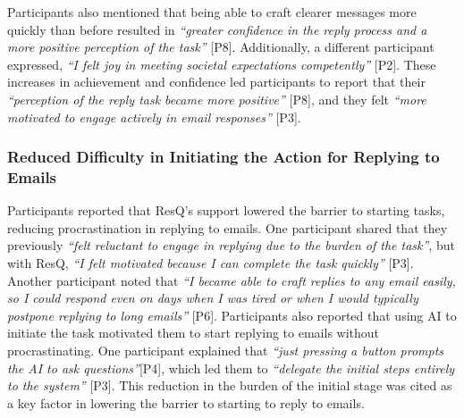 Participants also mentioned that being able to craft clearer messages more quickly than before resulted in \textit{``greater confidence in the reply process and a more positive perception of the task''} [P8]. 
Additionally, a different participant expressed, \textit{``I felt joy in meeting societal expectations competently''} [P2].
These increases in achievement and confidence led participants to report that their \textit{``perception of the reply task became more positive''} [P8], and they felt \textit{``more motivated to engage actively in email responses''} [P3]. 

\subsubsection{Reduced Difficulty in Initiating the Action for Replying to Emails}
\label{sec:result2_initiating_the_action}
Participants reported that ResQ's support lowered the barrier to starting tasks, reducing procrastination in replying to emails.
One participant shared that they previously \textit{``felt reluctant to engage in replying due to the burden of the task''}, but with ResQ, \textit{``I felt motivated because I can complete the task quickly''} [P3]. 
Another participant noted that \textit{``I became able to craft replies to any email easily, so I could respond even on days when I was tired or when I would typically postpone replying to long emails''} [P6].
Participants also reported that using AI to initiate the task motivated them to start replying to emails without procrastinating. 
One participant explained that \textit{``just pressing a button prompts the AI to ask questions''}[P4], which led them to \textit{``delegate the initial steps entirely to the system''} [P3]. 
This reduction in the burden of the initial stage was cited as a key factor in lowering the barrier to starting to reply to emails. 

